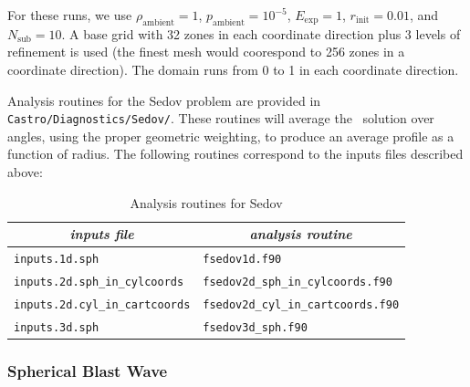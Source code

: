 For these runs, we use $\rho_\mathrm{ambient} = 1$,
$p_\mathrm{ambient} = 10^{-5}$, $E_\mathrm{exp} = 1$, $r_\mathrm{init}
 = 0.01$, and $N_\mathrm{sub} = 10$.  A base grid with 32 zones in each
coordinate direction plus 3 levels of refinement is used (the finest
mesh would coorespond to 256 zones in a coordinate direction).  The
domain runs from 0 to 1 in each coordinate direction.




Analysis routines for the Sedov problem are provided in
{\tt Castro/Diagnostics/Sedov/}.  These routines will
average the \castro\ solution over angles, using the proper geometric
weighting, to produce an average profile as a function of radius.
The following routines correspond to the inputs files described above:
\begin{table}[h]
\centering
{\small
\begin{tabular}{|l|l|} \hline
\multicolumn{1}{|c}{\em inputs file} &  \multicolumn{1}{|c|}{\em analysis routine} \\
\hline
{\tt inputs.1d.sph} & {\tt fsedov1d.f90} \\
%
{\tt inputs.2d.sph\_in\_cylcoords} & {\tt fsedov2d\_sph\_in\_cylcoords.f90} \\
%
{\tt inputs.2d.cyl\_in\_cartcoords} & {\tt fsedov2d\_cyl\_in\_cartcoords.f90} \\
%
{\tt inputs.3d.sph} & {\tt fsedov3d\_sph.f90} \\
\hline
\end{tabular}
} %
\caption{\label{table:fsedov} Analysis routines for Sedov}
\end{table}

\subsubsection{Spherical Blast Wave}

